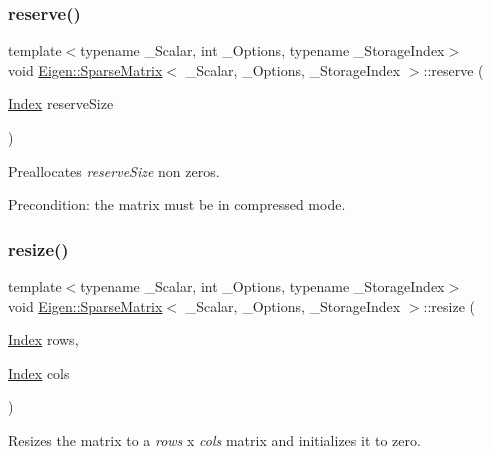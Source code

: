 \subsubsection{\texorpdfstring{reserve()}{reserve()}}
{\footnotesize\ttfamily template$<$typename \+\_\+\+Scalar, int \+\_\+\+Options, typename \+\_\+\+Storage\+Index$>$ \\
void \mbox{\hyperlink{class_eigen_1_1_sparse_matrix}{Eigen\+::\+Sparse\+Matrix}}$<$ \+\_\+\+Scalar, \+\_\+\+Options, \+\_\+\+Storage\+Index $>$\+::reserve (\begin{DoxyParamCaption}\item[{\mbox{\hyperlink{struct_eigen_1_1_eigen_base_a554f30542cc2316add4b1ea0a492ff02}{Index}}}]{reserve\+Size }\end{DoxyParamCaption})\hspace{0.3cm}{\ttfamily [inline]}}

Preallocates {\itshape reserve\+Size} non zeros.

Precondition\+: the matrix must be in compressed mode. \mbox{\label{class_eigen_1_1_sparse_matrix_af88551f30202341b7cc24cfadabdec5c}} 
\subsubsection{\texorpdfstring{resize()}{resize()}}
{\footnotesize\ttfamily template$<$typename \+\_\+\+Scalar, int \+\_\+\+Options, typename \+\_\+\+Storage\+Index$>$ \\
void \mbox{\hyperlink{class_eigen_1_1_sparse_matrix}{Eigen\+::\+Sparse\+Matrix}}$<$ \+\_\+\+Scalar, \+\_\+\+Options, \+\_\+\+Storage\+Index $>$\+::resize (\begin{DoxyParamCaption}\item[{\mbox{\hyperlink{struct_eigen_1_1_eigen_base_a554f30542cc2316add4b1ea0a492ff02}{Index}}}]{rows,  }\item[{\mbox{\hyperlink{struct_eigen_1_1_eigen_base_a554f30542cc2316add4b1ea0a492ff02}{Index}}}]{cols }\end{DoxyParamCaption})\hspace{0.3cm}{\ttfamily [inline]}}

Resizes the matrix to a {\itshape rows} x {\itshape cols} matrix and initializes it to zero.

